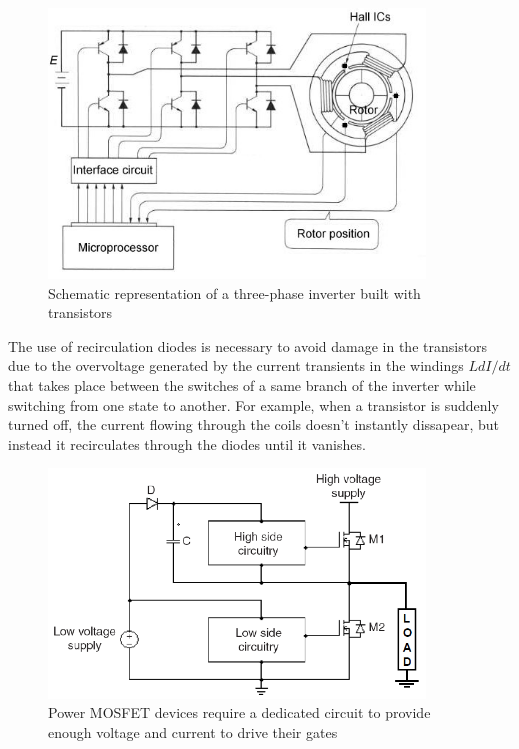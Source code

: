 \begin{figure}[htbp]
\centering
\includegraphics[width=10cm]{Images/inverter_1.png} 
\caption[Three-Phase Inverter]{Schematic representation of a three-phase inverter built with transistors}
\label{fig:inverter_1}
\end{figure}

The use of recirculation diodes is necessary to avoid damage in the transistors due to the overvoltage generated by the current transients in the windings $L dI/dt$ that takes place between the switches of a same branch of the inverter while switching from one state to another. For example, when a transistor is suddenly turned off, the current flowing through the coils doesn't instantly dissapear, but instead it recirculates through the diodes until it vanishes.

\begin{figure}[htbp]
\centering
\includegraphics[width=10cm]{Images/bootstrap.png} 
\caption[High-Side and Low-Side Driving Scheme]{Power MOSFET devices require a dedicated circuit to provide enough voltage and current to drive their gates}
\label{fig:bootstrap}
\end{figure}


